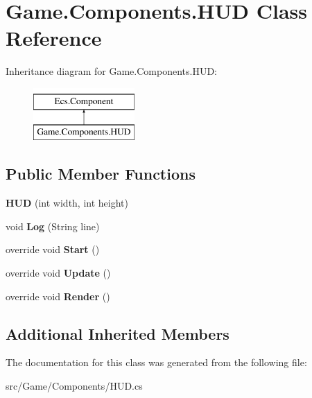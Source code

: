 \hypertarget{class_game_1_1_components_1_1_h_u_d}{}\section{Game.\+Components.\+H\+UD Class Reference}
\label{class_game_1_1_components_1_1_h_u_d}
Inheritance diagram for Game.\+Components.\+H\+UD\+:\begin{figure}[H]
\begin{center}
\leavevmode
\includegraphics[height=2.000000cm]{class_game_1_1_components_1_1_h_u_d}
\end{center}
\end{figure}
\subsection*{Public Member Functions}
\begin{DoxyCompactItemize}
\item 
\mbox{\label{class_game_1_1_components_1_1_h_u_d_aea9e5880d4b970eba116f1655a4e3b16}} 
{\bfseries H\+UD} (int width, int height)
\item 
\mbox{\label{class_game_1_1_components_1_1_h_u_d_aca74740e211eeca07cd6ed4b6dde7b8d}} 
void {\bfseries Log} (String line)
\item 
\mbox{\label{class_game_1_1_components_1_1_h_u_d_a214dfb53aba288d958d1f4a565155aba}} 
override void {\bfseries Start} ()
\item 
\mbox{\label{class_game_1_1_components_1_1_h_u_d_a018dd412d1e5a6650b0dddb68e0da051}} 
override void {\bfseries Update} ()
\item 
\mbox{\label{class_game_1_1_components_1_1_h_u_d_ab3f42934b91fd4c72caef545a8b6d9f6}} 
override void {\bfseries Render} ()
\end{DoxyCompactItemize}
\subsection*{Additional Inherited Members}


The documentation for this class was generated from the following file\+:\begin{DoxyCompactItemize}
\item 
src/\+Game/\+Components/H\+U\+D.\+cs\end{DoxyCompactItemize}
